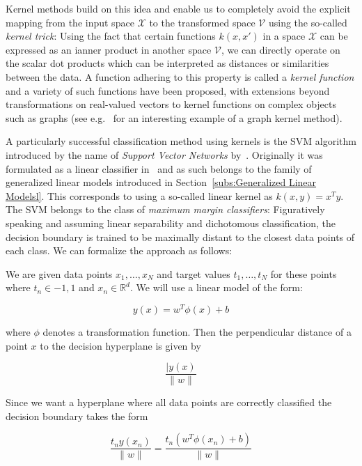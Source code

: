 Kernel methods build on this idea and enable us to completely avoid the explicit mapping from the input space $\mathcal{X}$ to the transformed space $\mathcal{V}$ using the so-called \emph{kernel trick}: Using the fact that certain functions $k(x, x')$ in a space $\mathcal{X}$ can be expressed as an ianner product in another space $\mathcal{V}$, we can directly operate on the scalar dot products which can be interpreted as distances or similarities between the data. A function adhering to this property is called a \emph{kernel function} and a variety of such functions have been proposed, with extensions beyond transformations on real-valued vectors to kernel functions on complex objects such as graphs (see e.g.~\cite{Shervashidze:2011aa} for an interesting example of a graph kernel method).

A particularly successful classification method using kernels is the \gls{SVM} algorithm introduced by the name of \emph{Support Vector Networks} by~\cite{Cortes:aa}. Originally it was formulated as a linear classifier in~\cite{Vapnik:1982aa} and as such belongs to the family of generalized linear models introduced in Section~\ref{subs:Generalized Linear Modelsl}. This corresponds to using a so-called linear kernel as $k(x, y) = x^T y$. The \gls{SVM} belongs to the class of \emph{maximum margin classifiers}: Figuratively speaking and assuming linear separability and dichotomous classification, the decision boundary is trained to be maximally distant to the closest data points of each class. We can formalize the approach as follows:

We are given data points $x_1, \ldots, x_N$ and target values $t_1, \ldots, t_N$ for these points where $t_n \in {-1, 1}$ and $x_n \in \mathbb{R}^d$. We will use a linear model of the form:

\begin{equation}
	y(x) = w^T \phi(x) + b
	\label{eq:svm linear model}
\end{equation}

where $\phi$ denotes a transformation function. Then the perpendicular distance of a point $x$ to the decision hyperplane is given by

\begin{equation}
	\frac{|y(x)}{\|w\|}
\end{equation}

Since we want a hyperplane where all data points are correctly classified the decision boundary takes the form

\begin{equation}
	\frac{t_n y(x_n)}{\|w\|} = \frac{t_n (w^T \phi(x_n) + b)}{\|w\|}
\end{equation}

